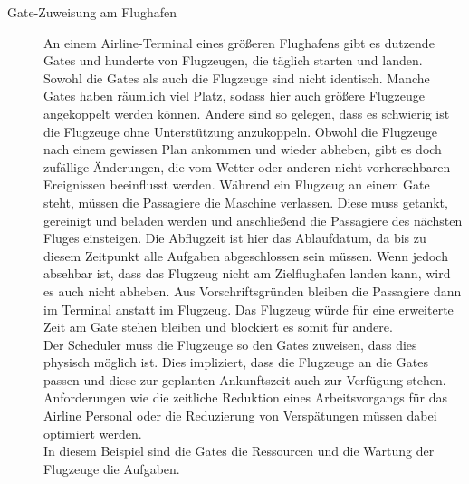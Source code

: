 \begin{description}
\item[Gate-Zuweisung am Flughafen]
An einem Airline-Terminal eines größeren Flughafens gibt es dutzende Gates und hunderte von Flugzeugen, die täglich starten und landen. Sowohl die Gates als auch die Flugzeuge sind nicht identisch. Manche Gates haben räumlich viel Platz, sodass hier auch größere Flugzeuge angekoppelt werden können. Andere sind so gelegen, dass es schwierig ist die Flugzeuge ohne Unterstützung anzukoppeln. Obwohl die Flugzeuge nach einem gewissen Plan ankommen und wieder abheben, gibt es doch zufällige Änderungen, die vom Wetter oder anderen nicht vorhersehbaren Ereignissen beeinflusst werden. Während ein Flugzeug an einem Gate steht, müssen die Passagiere die Maschine verlassen. Diese muss getankt, gereinigt und beladen werden und anschließend die Passagiere des nächsten Fluges einsteigen. Die Abflugzeit ist hier das Ablaufdatum, da bis zu diesem Zeitpunkt alle Aufgaben abgeschlossen sein müssen. Wenn jedoch absehbar ist, dass das Flugzeug nicht am Zielflughafen landen kann, wird es auch nicht abheben. Aus Vorschriftsgründen bleiben die Passagiere dann im Terminal anstatt im Flugzeug. Das Flugzeug würde für eine erweiterte Zeit am Gate stehen bleiben und blockiert es somit für andere.\\
Der Scheduler muss die Flugzeuge so den Gates zuweisen, dass dies physisch möglich ist. Dies impliziert, dass die Flugzeuge an die Gates passen und diese zur geplanten Ankunftszeit auch zur Verfügung stehen. Anforderungen wie die zeitliche Reduktion eines Arbeitsvorgangs für das Airline Personal oder die Reduzierung von Verspätungen müssen dabei optimiert werden.\\
In diesem Beispiel sind die Gates die Ressourcen und die Wartung der Flugzeuge die Aufgaben. 

\end{description}
